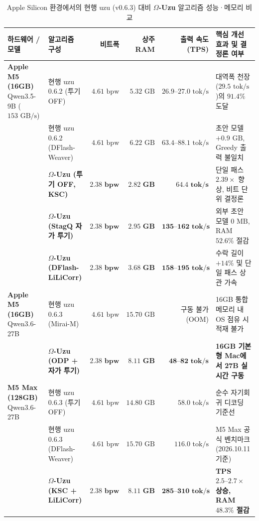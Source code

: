 \documentclass[10pt,a4paper]{article}
\begin{document}
\begin{table}[ht!]
\centering
\small
\caption{Apple Silicon 환경에서의 현행 \textsf{uzu} (v0.6.3) 대비 \textbf{$\Omega$-Uzu} 알고리즘 성능·메모리 비교}
\vspace{2mm}
\begin{tabularx}{\textwidth}{p{2.5cm} p{3.4cm} r r r X}
\toprule
\textbf{하드웨어 / 모델} & \textbf{알고리즘 구성} & \textbf{비트폭} & \textbf{상주 RAM} & \textbf{출력 속도 (TPS)} & \textbf{핵심 개선 효과 및 결정론 여부} \\
\midrule
\textbf{Apple M5 (16GB)} \newline \textsf{Qwen3.5-9B} \newline ($153\text{ GB/s}$) &
현행 \textsf{uzu 0.6.2} (투기 OFF) \cite{zenn2026uzu} & $4.61\text{ bpw}$ & $5.32\text{ GB}$ & $26.9\text{--}27.0\text{ tok/s}$ & 대역폭 천장($29.5\text{ tok/s}$)의 $91.4\%$ 도달 \\
 & 현행 \textsf{uzu 0.6.2} (\textsf{DFlash-Weaver}) \cite{zenn2026uzu} & $4.61\text{ bpw}$ & $6.22\text{ GB}$ & $63.4\text{--}88.1\text{ tok/s}$ & 초안 모델 $+0.9\text{ GB}$, Greedy 출력 불일치 \\
 & \textbf{$\Omega$-Uzu (투기 OFF, KSC)} & $\mathbf{2.38\text{ bpw}}$ & $\mathbf{2.82\text{ GB}}$ & $\mathbf{64.4\text{ tok/s}}$ & 단일 패스 $2.39\times$ 향상, 비트 단위 결정론 \\
 & \textbf{$\Omega$-Uzu (StagQ 자가 투기)} & $\mathbf{2.38\text{ bpw}}$ & $\mathbf{2.95\text{ GB}}$ & $\mathbf{135\text{--}162\text{ tok/s}}$ & 외부 초안 모델 $0\text{ MB}$, RAM $52.6\%$ 절감 \\
 & \textbf{$\Omega$-Uzu (\textsf{DFlash-LiLiCorr})} & $\mathbf{2.38\text{ bpw}}$ & $\mathbf{3.68\text{ GB}}$ & $\mathbf{158\text{--}195\text{ tok/s}}$ & 수락 길이 $+14\%$ 및 단일 패스 상관 가속 \\
\midrule
\textbf{Apple M5 (16GB)} \newline \textsf{Qwen3.6-27B} &
현행 \textsf{uzu 0.6.3} (\textsf{Mirai-M}) & $4.61\text{ bpw}$ & $15.70\text{ GB}$ & 구동 불가 (OOM) & 16GB 통합 메모리 내 OS 점유 시 적재 불가 \\
 & \textbf{$\Omega$-Uzu (ODP + 자가 투기)} & $\mathbf{2.38\text{ bpw}}$ & $\mathbf{8.11\text{ GB}}$ & $\mathbf{48\text{--}82\text{ tok/s}}$ & \textbf{16GB 기본형 Mac에서 27B 실시간 구동} \\
\midrule
\textbf{M5 Max (128GB)} \newline \textsf{Qwen3.6-27B} &
현행 \textsf{uzu 0.6.3} (투기 OFF) \cite{mirai2026specdec} & $4.61\text{ bpw}$ & $14.80\text{ GB}$ & $58.0\text{ tok/s}$ & 순수 자기회귀 디코딩 기준선 \\
 & 현행 \textsf{uzu 0.6.3} (\textsf{DFlash-Weaver}) \cite{mirai2026specdec} & $4.61\text{ bpw}$ & $15.70\text{ GB}$ & $116.0\text{ tok/s}$ & M5 Max 공식 벤치마크 (2026.10.11 기준) \\
 & \textbf{$\Omega$-Uzu (KSC + LiLiCorr)} & $\mathbf{2.38\text{ bpw}}$ & $\mathbf{8.11\text{ GB}}$ & $\mathbf{285\text{--}310\text{ tok/s}}$ & \textbf{TPS $2.5\text{--}2.7\times$ 상승, RAM $48.3\%$ 절감} \\
\bottomrule
\end{tabularx}
\label{tab:performance_projection}
\end{table}
\end{document}
